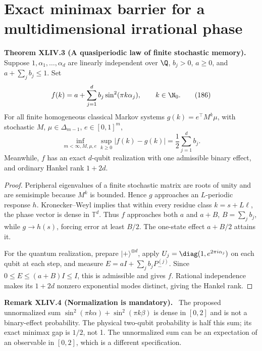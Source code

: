 \documentclass[11pt,a4paper,oneside]{book}
\newcommand{\statement}[3]{\par\medskip\noindent\textbf{#1 #2 (#3).}\ }
\begin{document}
\section{Exact minimax barrier for a multidimensional irrational phase}
\statement{Theorem}{XLIV.3}{A quasiperiodic law of finite stochastic memory}
Suppose $1,\alpha_1,\ldots,\alpha_d$ are linearly independent over $\Q$, $b_j>0$, $a\ge0$, and $a+\sum_jb_j\le1$. Set
\begin{equation}f(k)=a+\sum_{j=1}^db_j\sin^2(\pi k\alpha_j),\qquad k\in\N_0.\tag{186}\end{equation}
For all finite homogeneous classical Markov systems $g(k)=e^\top M^k\mu$, with stochastic $M$, $\mu\in\Delta_{m-1}$, $e\in[0,1]^m$,
\begin{equation}\inf_{m<\infty,M,\mu,e}\sup_{k\ge0}|f(k)-g(k)|=\frac12\sum_{j=1}^db_j.\tag{187}\end{equation}
Meanwhile, $f$ has an exact $d$-qubit realization with one admissible binary effect, and ordinary Hankel rank $1+2d$.
\begin{proof}
Peripheral eigenvalues of a finite stochastic matrix are roots of unity and are semisimple because $M^k$ is bounded. Hence $g$ approaches an $L$-periodic response $h$. Kronecker--Weyl implies that within every residue class $k=s+L\ell$, the phase vector is dense in $\mathbb T^d$. Thus $f$ approaches both $a$ and $a+B$, $B=\sum_jb_j$, while $g\to h(s)$, forcing error at least $B/2$. The one-state effect $a+B/2$ attains it.

For the quantum realization, prepare $|+\rangle^{\otimes d}$, apply $U_j=\diag(1,e^{2\pi i\alpha_j})$ on each qubit at each step, and measure $E=aI+\sum_jb_jP_-^{(j)}$. Since $0\le E\le(a+B)I\le I$, this is admissible and gives $f$. Rational independence makes its $1+2d$ nonzero exponential modes distinct, giving the Hankel rank.
\end{proof}
\statement{Remark}{XLIV.4}{Normalization is mandatory}
The proposed unnormalized sum $\sin^2(\pi k\alpha)+\sin^2(\pi k\beta)$ is dense in $[0,2]$ and is not a binary-effect probability. The physical two-qubit probability is half this sum; its exact minimax gap is $1/2$, not 1. The unnormalized sum can be an expectation of an observable in $[0,2]$, which is a different specification.
\end{document}
